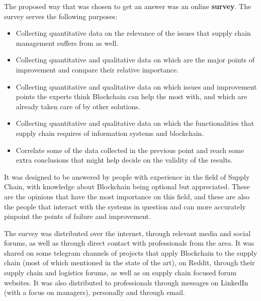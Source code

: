 The proposed way that was chosen to get an answer was an online \textbf{survey}. The survey serves the following purposes:


\begin{itemize}
\item Collecting quantitative data on the relevance of the issues that supply chain management suffers from as well. 
\item Collecting quantitative and qualitative data on which are the major points of improvement and compare their relative importance.
\item Collecting quantitative and qualitative data on which issues and improvement points the experts think Blockchain can help the most with, and which are already taken care of by other solutions.
\item Collecting quantitative and qualitative data on which the functionalities that supply chain requires of information systems and blockchain.
\item Correlate some of the data collected in the previous point and reach some extra conclusions that might help decide on the validity of the results.
\end{itemize}

It was designed to be answered by people with experience in the field of Supply Chain, with knowledge about Blockchain being optional but appreciated. These are the opinions that have the most importance on this field, and these are also the people that interact with the systems in question and can more accurately pinpoint the points of failure and improvement.


The survey was distributed over the internet, through relevant media and social forums, as well as through direct contact with professionals from the area. It was shared on some telegram channels of projects that apply Blockchain to the supply chain (most of which mentioned in the state of the art), on Reddit, through their supply chain and logistics forums, as well as on supply chain focused forum websites. It was also distributed to professionals through messages on LinkedIn (with a focus on managers), personally and through email.

